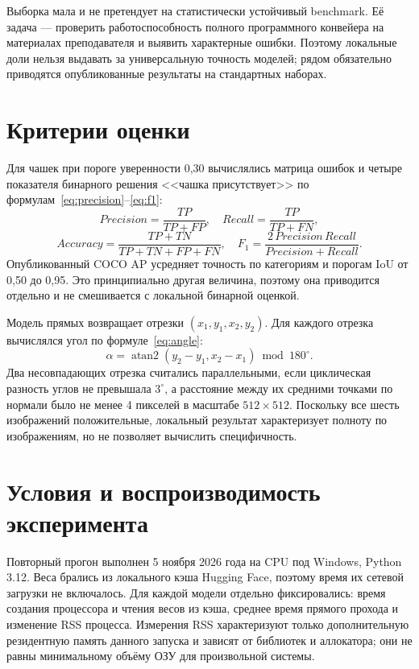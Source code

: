 \documentclass[a4paper,12pt]{extreport}
\begin{document}
Выборка мала и не претендует на статистически устойчивый benchmark. Её задача --- проверить работоспособность полного программного конвейера на материалах преподавателя и выявить характерные ошибки. Поэтому локальные доли нельзя выдавать за универсальную точность моделей; рядом обязательно приводятся опубликованные результаты на стандартных наборах.

\section{Критерии оценки}

Для чашек при пороге уверенности 0,30 вычислялись матрица ошибок и четыре показателя бинарного решения <<чашка присутствует>> по формулам~\eqref{eq:precision}--\eqref{eq:f1}:
\begin{equation}
Precision=\frac{TP}{TP+FP},\quad Recall=\frac{TP}{TP+FN},
\label{eq:precision}
\end{equation}
\begin{equation}
Accuracy=\frac{TP+TN}{TP+TN+FP+FN},\quad
F_1=\frac{2\,Precision\,Recall}{Precision+Recall}.
\label{eq:f1}
\end{equation}
Опубликованный COCO AP усредняет точность по категориям и порогам IoU от 0,50 до 0,95. Это принципиально другая величина, поэтому она приводится отдельно и не смешивается с локальной бинарной оценкой.

Модель прямых возвращает отрезки $(x_1,y_1,x_2,y_2)$. Для каждого отрезка вычислялся угол по формуле~\eqref{eq:angle}:
\begin{equation}
\alpha=\operatorname{atan2}(y_2-y_1,x_2-x_1)\bmod 180^\circ.
\label{eq:angle}
\end{equation}
Два несовпадающих отрезка считались параллельными, если циклическая разность углов не превышала $3^\circ$, а расстояние между их средними точками по нормали было не менее 4 пикселей в масштабе $512\times512$. Поскольку все шесть изображений положительные, локальный результат характеризует полноту по изображениям, но не позволяет вычислить специфичность.

\section{Условия и воспроизводимость эксперимента}

Повторный прогон выполнен 5 ноября 2026 года на CPU под Windows, Python 3.12. Веса брались из локального кэша Hugging Face, поэтому время их сетевой загрузки не включалось. Для каждой модели отдельно фиксировались: время создания процессора и чтения весов из кэша, среднее время прямого прохода и изменение RSS процесса. Измерения RSS характеризуют только дополнительную резидентную память данного запуска и зависят от библиотек и аллокатора; они не равны минимальному объёму ОЗУ для произвольной системы.
\end{document}
